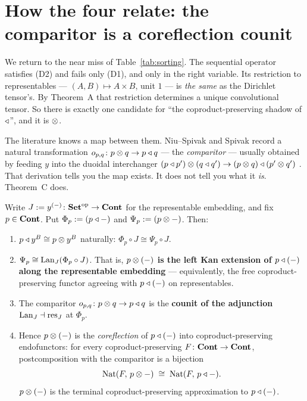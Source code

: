 \section{How the four relate: the comparitor is a coreflection counit}
\label{sec:comparitor}

We return to the near miss of Table~\ref{tab:sorting}. The sequential operator
satisfies (D2) and fails only (D1), and only in the right variable. Its
restriction to representables --- $(A,B)\mapsto A\times B$, unit $1$ --- is
\emph{the same} as the Dirichlet tensor's. By Theorem~A that restriction
determines a unique convolutional tensor. So there is exactly one candidate for
``the coproduct-preserving shadow of $\mathbin{\triangleleft}$'', and it is $\mathbin{\otimes}$.

The literature knows a map between them. Niu--Spivak
\cite[Ex.~6.85]{NiuSpivak} and Spivak \cite[eq.~(32)]{SpivakRef} record a natural
transformation $o_{p,q}\colon p\mathbin{\otimes} q\to p\mathbin{\triangleleft} q$ --- the \emph{comparitor} ---
usually obtained by feeding $y$ into the duoidal interchanger
$(p\mathbin{\triangleleft} p')\mathbin{\otimes}(q\mathbin{\triangleleft} q')\to(p\mathbin{\otimes} q)\mathbin{\triangleleft}(p'\mathbin{\otimes} q')$
\cite{SpivakSrinivasan}. That derivation tells you the map exists. It does not
tell you what it \emph{is}. Theorem~C does.

\begin{Theorem}[C]\label{thm:C}
Write $J:=y^{(-)}\colon\mathbf{Set}^{\mathrm{op}}\to\mathbf{Cont}$ for the representable
embedding, and fix $p\in\mathbf{Cont}$. Put $\Phi_p:=(p\mathbin{\triangleleft} -)$ and $\Psi_p:=(p\mathbin{\otimes} -)$.
Then:
\begin{enumerate}[label=(\arabic*)]
\item $p\mathbin{\triangleleft} y^B\cong p\mathbin{\otimes} y^B$ naturally: $\Phi_p\circ J\cong\Psi_p\circ J$.
\item $\Psi_p\cong\mathrm{Lan}_J(\Phi_p\circ J)$. That is, \textbf{$p\mathbin{\otimes}(-)$ is the left
  Kan extension of $p\mathbin{\triangleleft}(-)$ along the representable embedding} --- equivalently,
  the free coproduct-preserving functor agreeing with $p\mathbin{\triangleleft}(-)$ on
  representables.
\item The comparitor $o_{p,q}\colon p\mathbin{\otimes} q\to p\mathbin{\triangleleft} q$ is the \textbf{counit of
  the adjunction $\mathrm{Lan}_J\dashv\mathrm{res}_J$} at $\Phi_p$.
\item Hence $p\mathbin{\otimes}(-)$ is the \emph{coreflection} of $p\mathbin{\triangleleft}(-)$ into
  coproduct-preserving endofunctors: for every coproduct-preserving
  $F\colon\mathbf{Cont}\to\mathbf{Cont}$, postcomposition with the comparitor is a bijection
  \[
     \operatorname{Nat}(F,\,p\mathbin{\otimes} -)\;\cong\;\operatorname{Nat}(F,\,p\mathbin{\triangleleft} -).
  \]
  $p\mathbin{\otimes}(-)$ is the terminal coproduct-preserving approximation to $p\mathbin{\triangleleft}(-)$.
\end{enumerate}
\end{Theorem}

